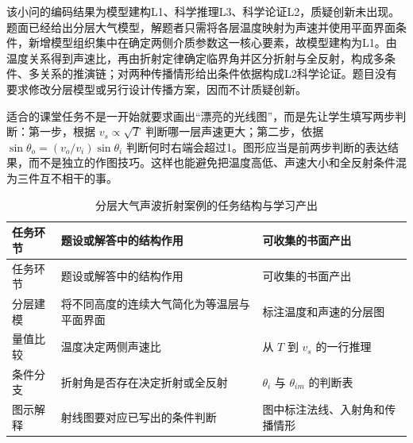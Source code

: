\documentclass[
  12pt,
  a4paper,twoside,openany]{ctexbook}
\begin{document}
该小问的编码结果为模型建构L1、科学推理L3、科学论证L2，质疑创新未出现。题面已经给出分层大气模型，解题者只需将各层温度映射为声速并使用平面界面条件，新增模型组织集中在确定两侧介质参数这一核心要素，故模型建构为L1。由温度关系得到声速比，再由折射定律确定临界角并区分折射与全反射，构成多条件、多关系的推演链；对两种传播情形给出条件依据构成L2科学论证。题目没有要求修改分层模型或另行设计传播方案，因而不计质疑创新。

适合的课堂任务不是一开始就要求画出``漂亮的光线图''，而是先让学生填写两步判断：第一步，根据
\(v_s\propto\sqrt T\) 判断哪一层声速更大；第二步，依据
\(\sin\theta_o=(v_o/v_i)\sin\theta_i\)
判断何时右端会超过1。图形应当是前两步判断的表达结果，而不是独立的作图技巧。这样也能避免把温度高低、声速大小和全反射条件混为三件互不相干的事。

\begin{longtable}[]{@{}
  >{\raggedright\arraybackslash}p{}
  >{\raggedright\arraybackslash}p{}
  >{\raggedright\arraybackslash}p{}@{}}
\caption{分层大气声波折射案例的任务结构与学习产出}\tabularnewline
\toprule\noalign{}
\rowcolor{ThesisPale}
\begin{minipage}[b]{\linewidth}\raggedright
任务环节
\end{minipage} & \begin{minipage}[b]{\linewidth}\raggedright
题设或解答中的结构作用
\end{minipage} & \begin{minipage}[b]{\linewidth}\raggedright
可收集的书面产出
\end{minipage} \\
\midrule\noalign{}
\endfirsthead
\toprule\noalign{}
\rowcolor{ThesisPale}
\begin{minipage}[b]{\linewidth}\raggedright
任务环节
\end{minipage} & \begin{minipage}[b]{\linewidth}\raggedright
题设或解答中的结构作用
\end{minipage} & \begin{minipage}[b]{\linewidth}\raggedright
可收集的书面产出
\end{minipage} \\
\midrule\noalign{}
\endhead
\bottomrule\noalign{}
\endlastfoot
分层建模 & 将不同高度的连续大气简化为等温层与平面界面 &
标注温度和声速的分层图 \\
量值比较 & 温度决定两侧声速比 & 从 \(T\) 到 \(v_s\) 的一行推理 \\
条件分支 & 折射角是否存在决定折射或全反射 & \(\theta_i\) 与
\(\theta_{im}\) 的判断表 \\
图示解释 & 射线图要对应已写出的条件判断 &
图中标注法线、入射角和传播情形 \\
\end{longtable}
\end{document}
